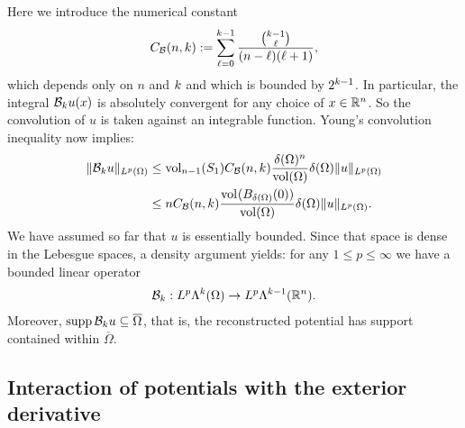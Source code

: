 \documentclass[10pt,a4paper]{article}
\begin{document}
Here we introduce the numerical constant 
\begin{gather}\label{equation:A_Bogov}
    C_{{\mathcal B}}(n,k) := \sum_{\ell=0}^{k-1} \frac{ \tbinom{k-1}{\ell} }{ (n-\ell)(\ell+1) }, 
\end{gather}
which depends only on $n$ and $k$ and which is bounded by $2^{k-1}$. 
In particular, the integral ${\mathcal B}_{k} u(x)$ is absolutely convergent for any choice of $x \in {\mathbb R}^{n}$. 
So the convolution of $u$ is taken against an integrable function. 
Young's convolution inequality now implies: 
\begin{align*}
    \| {\mathcal B}_{k} u \|_{L^{p}(\Omega)}
    &
    \leq 
    \operatorname{vol}_{n-1}(S_1) C_{{\mathcal B}}(n,k) \frac{ {\delta}(\Omega)^{n} }{\operatorname{vol}(\Omega)} 
    {\delta}(\Omega)
    \| u \|_{L^{p}(\Omega)}
    \\&
    \leq 
    n C_{{\mathcal B}}(n,k) \frac{ \operatorname{vol}_{}(B_{{\delta}(\Omega)}(0)) }{\operatorname{vol}(\Omega)} 
    {\delta}(\Omega)
    \| u \|_{L^{p}(\Omega)}
    .
\end{align*}
We have assumed so far that $u$ is essentially bounded.
Since that space is dense in the Lebesgue spaces, a density argument yields: 
for any $1 \leq p \leq \infty$ we have a bounded linear operator 
\begin{gather*}
    {\mathcal B}_{k} : L^{p}\Lambda^{k}(\Omega) \rightarrow L^{p}\Lambda^{k-1}({\mathbb R}^n).
\end{gather*}
Moreover, $\operatorname{supp} {\mathcal B}_{k} u \subseteq \overline\Omega$,
that is, the reconstructed potential has support contained within $\overline\Omega$. 
\\





\subsection{Interaction of potentials with the exterior derivative}
\end{document}
